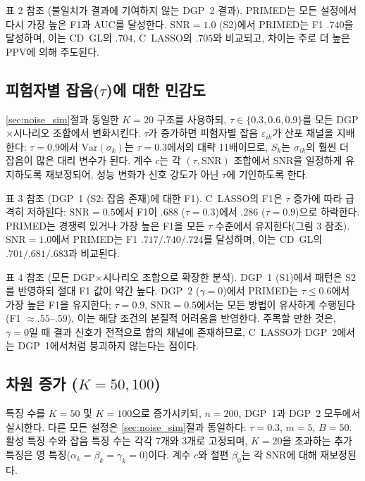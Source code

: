 \documentclass[a4paper,11pt]{article}
\begin{document}
표 2 참조 (불일치가 결과에 기여하지 않는 DGP~2 결과).
PRIMED는 모든 설정에서 다시 가장 높은 F1과 AUC를 달성한다.
$\mathrm{SNR} = 1.0$ (S2)에서 PRIMED는 F1 $.740$을 달성하며, 이는 CD~GL의 $.704$, C~LASSO의 $.705$와 비교되고, 차이는 주로 더 높은 PPV에 의해 주도된다.

\subsection{피험자별 잡음($\tau$)에 대한 민감도}\label{sec:high_tau}

\ref{sec:noise_sim}절과 동일한 $K = 20$ 구조를 사용하되, $\tau \in \{0.3, 0.6, 0.9\}$를 모든 DGP$\times$시나리오 조합에서 변화시킨다.
$\tau$가 증가하면 피험자별 잡음 $\varepsilon_{ik}$가 산포 채널을 지배한다: $\tau = 0.9$에서 $\mathrm{Var}(\sigma_k)$는 $\tau = 0.3$에서의 대략 11배이므로, $S_k$는 $\sigma_{ik}$의 훨씬 더 잡음이 많은 대리 변수가 된다.
계수 $c$는 각 $(\tau, \mathrm{SNR})$ 조합에서 SNR을 일정하게 유지하도록 재보정되어, 성능 변화가 신호 강도가 아닌 $\tau$에 기인하도록 한다.

표 3 참조 (DGP~1 (S2: 잡음 존재)에 대한 F1).
C~LASSO의 F1은 $\tau$ 증가에 따라 급격히 저하된다: $\mathrm{SNR} = 0.5$에서 F1이 $.688$ ($\tau = 0.3$)에서 $.286$ ($\tau = 0.9$)으로 하락한다.
PRIMED는 경쟁력 있거나 가장 높은 F1을 모든 $\tau$ 수준에서 유지한다(그림 3 참조).
$\mathrm{SNR} = 1.0$에서 PRIMED는 F1 $.717/.740/.724$를 달성하며, 이는 CD~GL의 $.701/.681/.683$과 비교된다.

표 4 참조 (모든 DGP$\times$시나리오 조합으로 확장한 분석).
DGP~1 (S1)에서 패턴은 S2를 반영하되 절대 F1 값이 약간 높다.
DGP~2 ($\gamma = 0$)에서 PRIMED는 $\tau \leq 0.6$에서 가장 높은 F1을 유지한다; $\tau = 0.9$, $\mathrm{SNR} = 0.5$에서는 모든 방법이 유사하게 수행된다(F1 $\approx .55$--.59), 이는 해당 조건의 본질적 어려움을 반영한다.
주목할 만한 것은, $\gamma = 0$일 때 결과 신호가 전적으로 합의 채널에 존재하므로, C~LASSO가 DGP~2에서는 DGP~1에서처럼 붕괴하지 않는다는 점이다.

\subsection{차원 증가 ($K = 50, 100$)}\label{sec:highdim}

특징 수를 $K = 50$ 및 $K = 100$으로 증가시키되, $n = 200$, DGP~1과 DGP~2 모두에서 실시한다.
다른 모든 설정은 \ref{sec:noise_sim}절과 동일하다: $\tau = 0.3$, $m = 5$, $B = 50$.
활성 특징 수와 잡음 특징 수는 각각 7개와 3개로 고정되며, $K = 20$을 초과하는 추가 특징은 영 특징($\alpha_k = \beta_k = \gamma_k = 0$)이다.
계수 $c$와 절편 $\beta_0$는 각 SNR에 대해 재보정된다.
\end{document}
